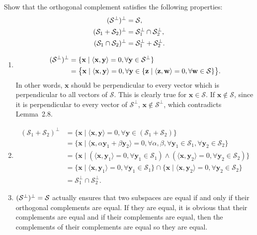 Show that the orthogonal complement satisfies the following properties:
\begin{align*}
(\mathcal{S}^\perp)^\perp &= \mathcal{S},\\
(\mathcal{S}_1 + \mathcal{S}_2)^\perp &= \mathcal{S}_1^\perp \cap \mathcal{S}_2^\perp,\\
(\mathcal{S}_1 \cap \mathcal{S}_2)^\perp &= \mathcal{S}_1^\perp + \mathcal{S}_2^\perp.
\end{align*}
\begin{solution}
  \begin{enumerate}
    \item
      \begin{align*}
        (\mathcal{S}^\perp)^\perp
        & = \{\mathbf{x} \mid \langle \mathbf{x},\mathbf{y}\rangle = 0, \forall \mathbf{y} \in \mathcal{S}^\perp\}\\
        & = \big\{\mathbf{x} \mid \langle \mathbf{x},\mathbf{y}\rangle = 0, \forall \mathbf{y} \in \{\mathbf{z} \mid \langle \mathbf{z},\mathbf{w}\rangle = 0, \forall \mathbf{w} \in \mathcal{S}\}\big\}.
      \end{align*}
      In other words, $\mathbf{x}$ should be perpendicular to every vector which is perpendicular to all vectors of $\mathcal{S}$.
      This is clearly true for $\mathbf{x} \in \mathcal{S}$.
      If $\mathbf{x} \notin \mathcal{S}$, since it is perpendicular to every vector of $\mathcal{S}^\perp$, $\mathbf{x} \notin \mathcal{S}^\perp$, which contradicts Lemma~2.8.
    \item
      \begin{align*}
        (\mathcal{S}_1 + \mathcal{S}_2)^\perp
        & = \{\mathbf{x} \mid \langle\mathbf{x},\mathbf{y}\rangle = 0, \forall \mathbf{y} \in (\mathcal{S}_1+\mathcal{S}_2)\}\\
        & = \{\mathbf{x} \mid \langle \mathbf{x},\alpha \mathbf{y}_1 + \beta \mathbf{y}_2\rangle = 0, \forall \alpha,\beta, \forall \mathbf{y}_1 \in \mathcal{S}_1, \forall \mathbf{y}_2 \in \mathcal{S}_2\}\\
        & = \{\mathbf{x} \mid (\langle\mathbf{x}, \mathbf{y}_1\rangle = 0, \forall \mathbf{y}_1 \in \mathcal{S}_1) \land (\langle\mathbf{x}, \mathbf{y}_2\rangle = 0, \forall \mathbf{y}_2 \in \mathcal{S}_2)\}\\
        & = \{\mathbf{x} \mid \langle\mathbf{x}, \mathbf{y}_1\rangle = 0, \forall \mathbf{y}_1 \in \mathcal{S}_1\} \cap \{\mathbf{x} \mid \langle\mathbf{x}, \mathbf{y}_2\rangle = 0, \forall \mathbf{y}_2 \in \mathcal{S}_2\}\\
        & = \mathcal{S}_1^\perp \cap \mathcal{S}_2^\perp.
      \end{align*}
    \item
      $(\mathcal{S}^\perp)^\perp = \mathcal{S}$ actually ensures that
      two subspaces are equal if and only if their orthogonal complements are equal.
      If they are equal, it is obvious that their complements are equal
      and if their complements are equal, then the complements of their complements are equal so they are equal.


\end{enumerate}
\end{solution}
